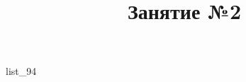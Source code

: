 \documentclass[12pt, a4paper]{article}
\begin{document}
	\title{Занятие №2}
	{list_94}
\end{document}
